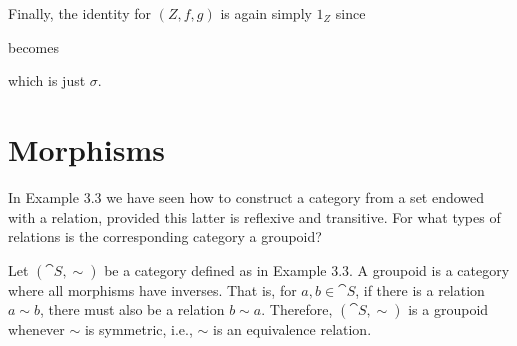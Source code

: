 \documentclass[notes,tikz]{agony}
\begin{document}
\begin{sol}
  Finally, the identity for $(Z,f,g)$ is again simply $1_Z$ since
  \begin{center}
    becomes
  \end{center}
  which is just $\sigma$.
\end{sol}

\section{Morphisms}


\begin{xca}
  In Example 3.3 we have seen how to construct a category from a set endowed with a relation,
  provided this latter is reflexive and transitive.
  For what types of relations is the corresponding category a groupoid?
\end{xca}
\begin{sol}
  Let $(\cat S, \sim)$ be a category defined as in Example 3.3.
  A groupoid is a category where all morphisms have inverses.
  That is, for $a,b \in \cat S$, if there is a relation $a \sim b$,
  there must also be a relation $b \sim a$.
  Therefore, $(\cat S, \sim)$ is a groupoid whenever $\sim$ is symmetric, i.e.,
  $\sim$ is an equivalence relation.
\end{sol}
\end{document}
